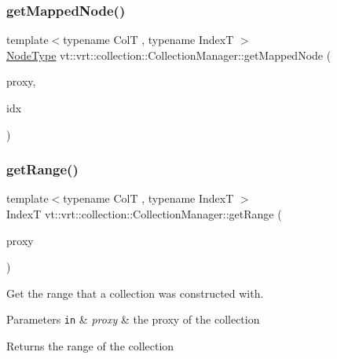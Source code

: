 \subsubsection{\texorpdfstring{get\+Mapped\+Node()}{getMappedNode()}}
{\footnotesize\ttfamily template$<$typename ColT , typename IndexT $>$ \\
\hyperlink{namespacevt_a866da9d0efc19c0a1ce79e9e492f47e2}{Node\+Type} vt\+::vrt\+::collection\+::\+Collection\+Manager\+::get\+Mapped\+Node (\begin{DoxyParamCaption}\item[{\hyperlink{structvt_1_1vrt_1_1collection_1_1_collection_manager_a56458ed7f9bb22b631b9b3a745f42f94}{Collection\+Proxy\+Wrap\+Type}$<$ ColT, IndexT $>$ const \&}]{proxy,  }\item[{typename Col\+T\+::\+Index\+Type const \&}]{idx }\end{DoxyParamCaption})}

\mbox{\label{structvt_1_1vrt_1_1collection_1_1_collection_manager_a9259954aca1df3a68ad1d0a730687612}} 
\subsubsection{\texorpdfstring{get\+Range()}{getRange()}}
{\footnotesize\ttfamily template$<$typename ColT , typename IndexT $>$ \\
IndexT vt\+::vrt\+::collection\+::\+Collection\+Manager\+::get\+Range (\begin{DoxyParamCaption}\item[{\hyperlink{namespacevt_a1b417dd5d684f045bb58a0ede70045ac}{Virtual\+Proxy\+Type}}]{proxy }\end{DoxyParamCaption})}



Get the range that a collection was constructed with. 


\begin{DoxyParams}[1]{Parameters}
\mbox{\tt in}  & {\em proxy} & the proxy of the collection\\
\hline
\end{DoxyParams}
\begin{DoxyReturn}{Returns}
the range of the collection 
\end{DoxyReturn}
\mbox{\label{structvt_1_1vrt_1_1collection_1_1_collection_manager_a3512b8e7d8bac218f28e7ffef611e5fa}} 
